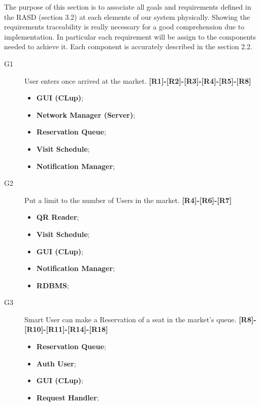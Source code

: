 The purpose of this section is to associate all goals and requirements defined in the RASD (section 3.2) at each elements of our system physically.
Showing the requirements traceability is really necessary for a good comprehension due to implementation.
In particular each requirement will be assign to the components needed to achieve it. 
Each component is accurately described in the section 2.2.


\begin{description}
    \item[G1]User enters once arrived at the market. \textbf{[R1]-[R2]-[R3]-[R4]-[R5]-[R8]}
    
    \begin{itemize}
        \item \textbf{GUI (CLup)}; 
        \item \textbf{Network Manager (Server)};  
        \item \textbf{Reservation Queue};
        \item \textbf{Visit Schedule};  
        \item \textbf{Notification Manager};  
        
    \end{itemize}
    
    \item[G2]Put a limit to the number of Users in the market. \textbf{[R4]-[R6]-[R7]}
    
    \begin{itemize}
        \item \textbf{QR Reader};
        \item \textbf{Visit Schedule};  
        \item \textbf{GUI (CLup)}; 
        \item \textbf{Notification Manager};  
        \item \textbf{RDBMS};
    \end{itemize}
    
        \item[G3]Smart User can make a Reservation of a seat in the market's queue. \textbf{[R8]-[R10]-[R11]-[R14]-[R18]}
    \begin{itemize}
        \item \textbf{Reservation Queue};  
        \item \textbf{Auth User};  
        \item \textbf{GUI (CLup)};  
        \item \textbf{Request Handler}; 
    \end{itemize}
        

\end{description}

